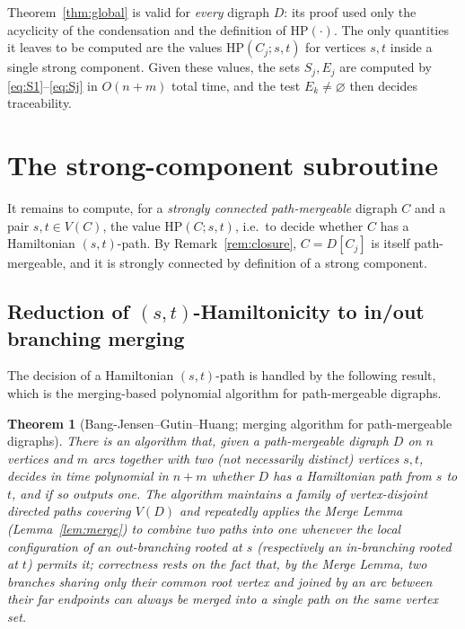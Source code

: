 \documentclass[12pt]{article}
\newtheorem{theorem}{Theorem}
\theoremstyle{definition}
\begin{document}
Theorem~\ref{thm:global} is valid for \emph{every} digraph $D$: its proof used
only the acyclicity of the condensation and the definition of
$\mathrm{HP}(\cdot)$. The only quantities it leaves to be computed are the values
$\mathrm{HP}(C_{j};s,t)$ for vertices $s,t$ inside a single strong component.
Given these values, the sets $S_{j},E_{j}$ are computed by
\eqref{eq:S1}--\eqref{eq:Sj} in $O(n+m)$ total time, and the test
$E_{k}\neq\varnothing$ then decides traceability.

\section{The strong-component subroutine}\label{sec:component}

It remains to compute, for a \emph{strongly connected path-mergeable} digraph $C$
and a pair $s,t\in V(C)$, the value $\mathrm{HP}(C;s,t)$, i.e.\ to decide whether
$C$ has a Hamiltonian $(s,t)$-path. By Remark~\ref{rem:closure}, $C=D[C_{j}]$ is
itself path-mergeable, and it is strongly connected by definition of a strong
component.

\subsection{Reduction of $(s,t)$-Hamiltonicity to in/out branching merging}

The decision of a Hamiltonian $(s,t)$-path is handled by the following result,
which is the merging-based polynomial algorithm for path-mergeable digraphs.

\begin{theorem}[Bang-Jensen--Gutin--Huang; merging algorithm for path-mergeable
digraphs]\label{thm:bgh}
There is an algorithm that, given a path-mergeable digraph $D$ on $n$ vertices and
$m$ arcs together with two (not necessarily distinct) vertices $s,t$, decides in
time polynomial in $n+m$ whether $D$ has a Hamiltonian path from $s$ to $t$, and if
so outputs one. The algorithm maintains a family of vertex-disjoint directed paths
covering $V(D)$ and repeatedly applies the Merge Lemma
\textup{(Lemma~\ref{lem:merge})} to combine two paths into one whenever the local
configuration of an out-branching rooted at $s$ (respectively an in-branching
rooted at $t$) permits it; correctness rests on the fact that, by the Merge Lemma,
two branches sharing only their common root vertex and joined by an arc between
their far endpoints can always be merged into a single path on the same vertex set.
\end{theorem}
\end{document}

